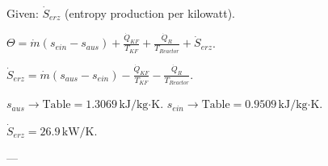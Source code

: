 Given: \( \dot{S}_{erz} \) (entropy production per kilowatt).  

\( \Theta = \dot{m} (s_{ein} - s_{aus}) + \frac{\dot{Q}_{KF}}{T_{KF}} + \frac{\dot{Q}_R}{T_{Reactor}} + \dot{S}_{erz} \).  

\( \dot{S}_{erz} = \dot{m} (s_{aus} - s_{ein}) - \frac{\dot{Q}_{KF}}{T_{KF}} - \frac{\dot{Q}_R}{T_{Reactor}} \).  

\( s_{aus} \rightarrow \text{Table} = 1.3069 \, \text{kJ/kg·K} \).  
\( s_{ein} \rightarrow \text{Table} = 0.9509 \, \text{kJ/kg·K} \).  

\( \dot{S}_{erz} = 26.9 \, \text{kW/K} \).  

---